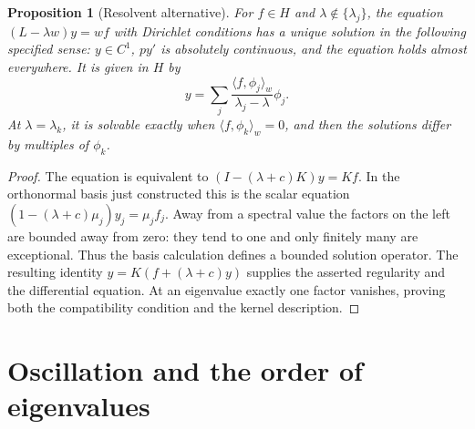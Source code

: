 \documentclass[11pt,oneside]{book}
\newtheorem{proposition}[theorem]{Proposition}
\theoremstyle{definition}
\theoremstyle{remark}\newtheorem{remark}[theorem]{Remark}
\begin{document}
\begin{proposition}[Resolvent alternative]\label{d13:10:resolvent}
For \(f\in H\) and \(\lambda\notin\{\lambda_j\}\), the equation
\((L-\lambda w)y=wf\) with Dirichlet conditions has a unique solution
in the following specified sense: \(y\in C^1\), \(py'\) is absolutely
continuous, and the equation holds almost everywhere. It is given in \(H\) by
\[
 y=\sum_j\frac{\langle f,\phi_j\rangle_w}{\lambda_j-\lambda}\phi_j.
\]
At \(\lambda=\lambda_k\), it is solvable exactly when
\(\langle f,\phi_k\rangle_w=0\), and then the solutions differ by multiples
of \(\phi_k\).
\end{proposition}
\begin{proof}
The equation is equivalent to
\((I-(\lambda+c)K)y=Kf\). In the orthonormal basis just constructed this
is the scalar equation
\((1-(\lambda+c)\mu_j)y_j=\mu_j f_j\).
Away from a spectral value the factors on the left are bounded away from
zero: they tend to one and only finitely many are exceptional.
Thus the basis calculation defines a bounded solution operator.
The resulting identity \(y=K(f+(\lambda+c)y)\) supplies the asserted
regularity and the differential equation. At an eigenvalue exactly one
factor vanishes, proving both the compatibility condition and the kernel
description.
\end{proof}

\section{Oscillation and the order of eigenvalues}
\end{document}
